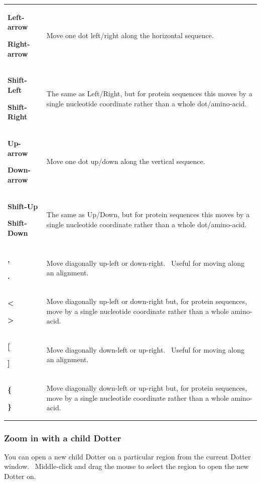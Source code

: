 \documentclass[letterpaper]{article}
\begin{document}
\begin{center}
\tablehead{}
\begin{supertabular}{p{2.802cm}p{10.704cm}}
{\bfseries Left-arrow}

\bfseries Right-arrow &
 Move one dot left/right along the horizontal
sequence.\\
{\bfseries Shift-Left}

\bfseries Shift-Right &
 The same as Left/Right, but for protein
sequences this moves by a single nucleotide coordinate rather than a
whole dot/amino-acid.\\
{\bfseries Up-arrow}

\bfseries Down-arrow &
 Move one dot up/down along the vertical
sequence.\\
{\bfseries Shift-Up}

\bfseries Shift-Down &
 The same as Up/Down, but for protein sequences
this moves by a single nucleotide coordinate rather than a whole
dot/amino-acid.\\
{\bfseries ,}

\bfseries . &
 Move diagonally up-left or down-right. \ Useful
for moving along an alignment.\\
{\bfseries {\textless}}

\bfseries {\textgreater} &
 Move diagonally up-left or down-right but, for
protein sequences, move by a single nucleotide coordinate rather than a
whole amino-acid.\\
{\bfseries [}

\bfseries ] &
 Move diagonally down-left or up-right. \ Useful
for moving along an alignment.\\
{\bfseries \{}

\bfseries \} &
 Move diagonally down-left or up-right but, for
protein sequences, move by a single nucleotide coordinate rather than a
whole amino-acid.\\
\end{supertabular}
\end{center}

{\color[rgb]{0.30980393,0.5058824,0.7411765}\subsubsection[Zoom in with a child Dotter]{Zoom in with a child Dotter}}
{You can open a new child Dotter on a particular region from the current
Dotter window. \ Middle-click and drag the mouse to select the region
to open the new Dotter on.}

\bigskip
\end{document}
